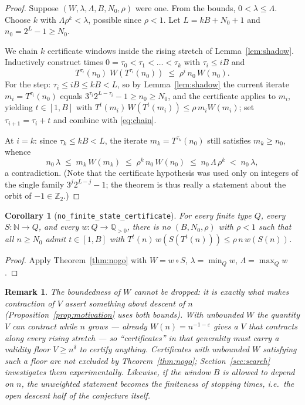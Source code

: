 \documentclass[11pt]{article}
\newtheorem{corollary}[theorem]{Corollary}
\newtheorem{remark}[theorem]{Remark}
\newcommand{\N}{\mathbb{N}}
\newcommand{\Q}{\mathbb{Q}}
\newcommand{\Z}{\mathbb{Z}}
\newcommand{\Ztwo}{\Z_2}
\newcommand{\code}[1]{\texttt{#1}}
\begin{document}
\begin{proof}
Suppose $(W, \lambda, \Lambda, B, N_0, \rho)$ were one. From the bounds,
$0 < \lambda \le \Lambda$. Choose $k$ with $\Lambda \rho^k < \lambda$,
possible since $\rho < 1$. Let $L = kB + N_0 + 1$ and $n_0 = 2^L - 1
\ge N_0$.

We chain $k$ certificate windows inside the rising stretch of
Lemma~\ref{lem:shadow}. Inductively construct times $0 = \tau_0 <
\tau_1 < \dots < \tau_k$ with $\tau_i \le iB$ and
\begin{equation}\label{eq:chain}
T^{\tau_i}(n_0)\; W\!\left(T^{\tau_i}(n_0)\right) \;\le\; \rho^i\,
n_0\, W(n_0).
\end{equation}
For the step: $\tau_i \le iB \le kB < L$, so by
Lemma~\ref{lem:shadow} the current iterate $m_i = T^{\tau_i}(n_0)$
equals $3^{\tau_i} 2^{L - \tau_i} - 1 \ge n_0 \ge N_0$, and the
certificate applies to $m_i$, yielding $t \in [1,B]$ with
$T^{t}(m_i)\,W(T^t(m_i)) \le \rho\, m_i W(m_i)$; set $\tau_{i+1} =
\tau_i + t$ and combine with \eqref{eq:chain}.

At $i = k$: since $\tau_k \le kB < L$, the iterate $m_k =
T^{\tau_k}(n_0)$ still satisfies $m_k \ge n_0$, whence
\[
n_0\, \lambda \;\le\; m_k\, W(m_k) \;\le\; \rho^k\, n_0\, W(n_0)
\;\le\; n_0\, \Lambda\, \rho^k \;<\; n_0\, \lambda,
\]
a contradiction. (Note that the certificate hypothesis was used only on
integers of the single family $3^j 2^{L-j} - 1$; the theorem is thus
really a statement about the orbit of $-1 \in \Ztwo$.)
\end{proof}

\begin{corollary}[\code{no\_finite\_state\_certificate}]\label{cor:fsm}
For every finite type $Q$, every $S \colon \N \to Q$, and every
$w \colon Q \to \Q_{>0}$, there is no $(B, N_0, \rho)$ with $\rho < 1$
such that all $n \ge N_0$ admit $t \in [1,B]$ with $T^t(n)\,
w(S(T^t(n))) \le \rho\, n\, w(S(n))$.
\end{corollary}

\begin{proof}
Apply Theorem~\ref{thm:nogo} with $W = w \circ S$, $\lambda = \min_Q w$,
$\Lambda = \max_Q w$.
\end{proof}

\begin{remark}\label{rem:unbounded}
The boundedness of $W$ cannot be dropped: it is exactly what makes
contraction of $V$ assert something about descent of $n$
(Proposition~\ref{prop:motivation} uses both bounds). With unbounded
$W$ the quantity $V$ can contract while $n$ grows --- already
$W(n) = n^{-1-\varepsilon}$ gives a $V$ that contracts along every
rising stretch --- so ``certificates'' in that generality must carry a
validity floor $V \ge n^{\delta}$ to certify anything. Certificates
with unbounded $W$ satisfying such a floor are \emph{not} excluded by
Theorem~\ref{thm:nogo}; Section~\ref{sec:search} investigates them
experimentally. Likewise, if the window $B$ is allowed to depend on
$n$, the unweighted statement becomes the finiteness of stopping
times, i.e.\ the open descent half of the conjecture itself.
\end{remark}
\end{document}
